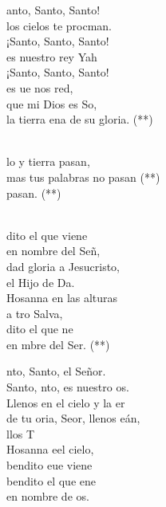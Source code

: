 \documentclass[12pt]{article}
\begin{document}
\begin{multicols*}{2}
\begin{cancion}[Santo][Carismático]%
	anto, Santo, Santo! \\
	los cielos te procman.\\
¡Santo, Santo, Santo! \\
	es nuestro rey Yah\\
¡Santo, Santo, Santo! \\
	es ue nos red,\\
	que mi Dios es So, \\
	la tierra ena de su gloria. (**)\\\jump\\
	\begin{chorus}%
	lo y tierra pasan, \\
	mas tus palabras no pasan (**)\\
	   pasan. (**)\\
	\end{chorus}%
	\jump\\
	dito el que viene \\
	en nombre del Señ, \\
dad gloria a Jesucristo, \\
	el Hijo de Da.\\
Hosanna en las alturas \\
	a tro Salva,\\
	dito el que ne \\
	en mbre del Ser. (**)\\
\end{cancion}%

\begin{cancion}[Santo][Estepa]%
	nto, Santo, el Señor.\\
	Santo, nto, es nuestro os.\\
\jump
	Llenos en el cielo y la er\\
	de tu oria, Seor, llenos eán,\\
	llos T\\
\jump
	Hosanna eel cielo, \\
	bendito eue viene\\
	bendito el que ene \\
	en nombre de os.\\
\end{cancion}%


\end{multicols*}
\end{document}
